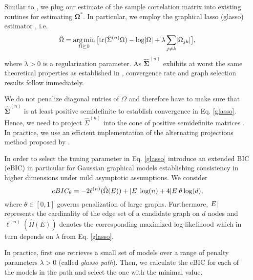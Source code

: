 Similar to \citet{Fan17}, we plug our estimate of the sample correlation matrix into existing routines for estimating $\mathbf{\Omega}^*$. In particular, we employ the graphical lasso (glasso) estimator \citep{Friedman08}, i.e.
\begin{equation}\label{glasso}
    \hat{\Omega} = \argmin_{\Omega \succeq 0} \big[\text{tr}(\hat{\Sigma}^{(n)}\Omega) - \log\Abs{\Omega} + \lambda \sum_{j\neq k}\Abs{\Omega_{jk}}\big], 
\end{equation}
where $\lambda > 0$ is a regularization parameter. As $\hat{\mathbf\Sigma}^{(n)}$ exhibits at worst the same theoretical properties as established in %
\citet{Liu09}, convergence rate and graph selection results follow immediately. 

We do not penalize diagonal entries of $\Omega$ and therefore have to make sure that $\hat{\mathbf\Sigma}^{(n)}$ is at least positive semidefinite to establish convergence in Eq. \eqref{glasso}. Hence, we need to project $\hat{\Sigma}^{(n)}$ into the cone of positive semidefinite matrices \citep[compare also][]{Liu12, Fan17}. In practice, we use an efficient implementation of the alternating projections method proposed by \citet{Higham88}.      

In order to select the tuning parameter in Eq. \eqref{glasso}
\citet{Foygel10} introduce an extended BIC (eBIC) in particular for Gaussian graphical models establishing consistency in higher dimensions under mild asymptotic assumptions. We consider
\begin{equation}\label{EBIC}
    eBIC_\theta = -2 \ell^{(n)}(\hat{\Omega}(E)) + \Abs{E} \log(n) + 4 \Abs{E}\theta \log(d),
\end{equation}
where $\theta \in [0,1]$ governs penalization of large graphs. Furthermore, $\abs{E}$ represents the cardinality of the edge set of a candidate graph on $d$ nodes and $\ell^{(n)}(\hat{\Omega}(E))$ denotes the corresponding maximized log-likelihood \citep[see][for more details]{Foygel10} which in turn depends on $\lambda$ from Eq. \eqref{glasso}. 

In practice, first one retrieves a small set of models over a range of penalty parameters $\lambda > 0$ (called \textit{glasso path}). Then, we calculate the eBIC for each of the models in the path and select the one with the minimal value. 

